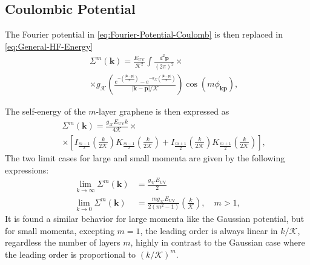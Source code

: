 \documentclass[english,aps,prd,nofootinbib,twocolumn]{revtex4-1}
\begin{document}
\subsection{Coulombic Potential}
\label{sect:Self-Energy-Coulomb}
The Fourier potential in \eqref{eq:Fourier-Potential-Coulomb} is then replaced in \eqref{eq:General-HF-Energy}
\begin{eqnarray}
&&\Sigma^{m}(\mathbf{k })  =  \frac{E_{\mathrm{UV}}}{\mathcal{K}^{2}}
\!\!
\int \!\! \frac{d^2 \mathbf{p}}{(2\pi)^2}
\times \\
 &&\times \nonumber 
g_{\mathcal{K}} \left( 
\frac{ 
e^{-\left(\!
\tfrac{\left|\mathbf{ k-p }\right|}
{\mathcal{K}}\!\right) }
\!\!-\!
e^{-a_{\mathcal{K}} 
\left(\!
\tfrac{\left|\mathbf{ k-p }\right|}
{\mathcal{K}}\!\right) } 
}{\left|\mathbf{ k-p }\right|/\mathcal{K}}
\right) 
\cos(m\phi_{\mathbf{ k p}}),
\end{eqnarray}

The self-energy of the $m$-layer graphene is then expressed as
\begin{eqnarray}
\!\!&&\Sigma^{m}(\mathbf{k })
 = 
\frac{g_{\mathcal{K}}E_{\mathrm{UV}} k}{4 \mathcal{K}} 
\times \\ \!\! &&\times 
\left[ 
I_{\frac{m-1}{2}}\!\!
\left(\! \frac{k}{2\mathcal{K}} \!\right) \!\!
K_{\frac{m-1}{2}}\!\!
\left(\! \frac{k}{2\mathcal{K}} \!\right)
\!\! + \!
I_{\frac{m+1}{2}}\!\!
\left(\! \frac{k}{2\mathcal{K}} \!\right) \!\!
K_{\frac{m+1}{2}}\!\!
\left(\! \frac{k}{2\mathcal{K}} \!\right)
\!
\right]
\!
, \nonumber 
\end{eqnarray}
The two limit cases for large and small momenta are given by the following expressions:
\begin{equation}
\begin{split}
\lim_{k\rightarrow \infty} \Sigma^{m}(\mathbf{k }) &=
\frac{g_{\mathcal{K}}E_{\mathrm{UV}}}{2} \\
\lim_{k\rightarrow 0} \Sigma^{m}(\mathbf{k }) &=
\frac{m g_{\mathcal{K}} E_{\mathrm{UV}}}{2(m^{2}-1)}\left( \frac{k}{\mathcal{K}} \right), \quad m>1,
\end{split}
\end{equation}
It is found a similar behavior for large momenta like the Gaussian potential, but for small momenta, excepting $m=1$, the leading order is always linear in $k/\mathcal{K}$, regardless the number of layers $m$, highly in contrast to the Gaussian case where the leading order is proportional to $(k/\mathcal{K})^{m}$.
\\
\end{document}
